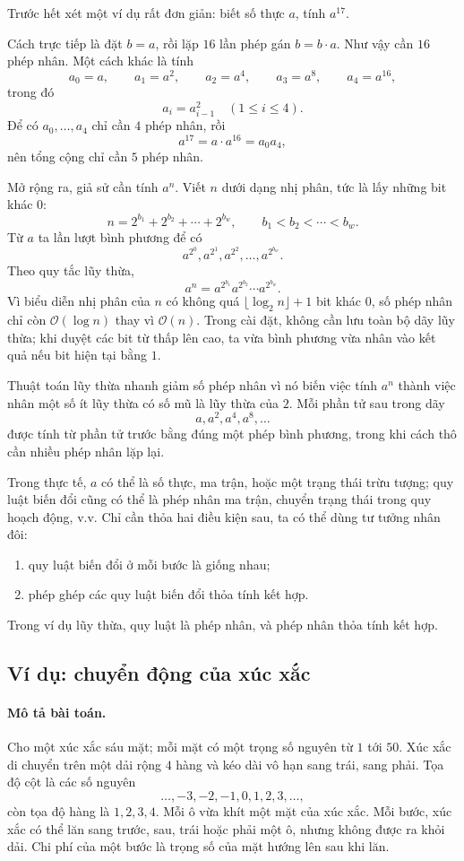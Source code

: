 \documentclass[11pt]{article}
\newcommand{\Oh}{\mathcal{O}}
\begin{document}
Trước hết xét một ví dụ rất đơn giản: biết số thực $a$, tính $a^{17}$.

Cách trực tiếp là đặt $b=a$, rồi lặp $16$ lần phép gán $b=b\cdot a$. Như vậy
cần $16$ phép nhân. Một cách khác là tính
\[
  a_0=a,\qquad a_1=a^2,\qquad a_2=a^4,\qquad
  a_3=a^8,\qquad a_4=a^{16},
\]
trong đó
\[
  a_i=a_{i-1}^2\quad (1\le i\le 4).
\]
Để có $a_0,\ldots,a_4$ chỉ cần $4$ phép nhân, rồi
\[
  a^{17}=a\cdot a^{16}=a_0a_4,
\]
nên tổng cộng chỉ cần $5$ phép nhân.

Mở rộng ra, giả sử cần tính $a^n$. Viết $n$ dưới dạng nhị phân, tức là lấy
những bit khác $0$:
\[
  n=2^{b_1}+2^{b_2}+\cdots+2^{b_w},\qquad
  b_1<b_2<\cdots<b_w.
\]
Từ $a$ ta lần lượt bình phương để có
\[
  a^{2^0},a^{2^1},a^{2^2},\ldots,a^{2^{b_w}}.
\]
Theo quy tắc lũy thừa,
\[
  a^n=a^{2^{b_1}}a^{2^{b_2}}\cdots a^{2^{b_w}}.
\]
Vì biểu diễn nhị phân của $n$ có không quá $\lfloor \log_2 n\rfloor+1$ bit
khác $0$, số phép nhân chỉ còn $\Oh(\log n)$ thay vì $\Oh(n)$. Trong cài đặt,
không cần lưu toàn bộ dãy lũy thừa; khi duyệt các bit từ thấp lên cao, ta vừa
bình phương vừa nhân vào kết quả nếu bit hiện tại bằng $1$.

Thuật toán lũy thừa nhanh giảm số phép nhân vì nó biến việc tính $a^n$ thành
việc nhân một số ít lũy thừa có số mũ là lũy thừa của $2$. Mỗi phần tử sau
trong dãy
\[
  a,a^2,a^4,a^8,\ldots
\]
được tính từ phần tử trước bằng đúng một phép bình phương, trong khi cách thô
cần nhiều phép nhân lặp lại.

Trong thực tế, $a$ có thể là số thực, ma trận, hoặc một trạng thái trừu
tượng; quy luật biến đổi cũng có thể là phép nhân ma trận, chuyển trạng thái
trong quy hoạch động, v.v. Chỉ cần thỏa hai điều kiện sau, ta có thể dùng tư
tưởng nhân đôi:
\begin{enumerate}
  \item quy luật biến đổi ở mỗi bước là giống nhau;
  \item phép ghép các quy luật biến đổi thỏa tính kết hợp.
\end{enumerate}
Trong ví dụ lũy thừa, quy luật là phép nhân, và phép nhân thỏa tính kết hợp.

\subsection{Ví dụ: chuyển động của xúc xắc}

\paragraph{Mô tả bài toán.}
Cho một xúc xắc sáu mặt; mỗi mặt có một trọng số nguyên từ $1$ tới $50$. Xúc
xắc di chuyển trên một dải rộng $4$ hàng và kéo dài vô hạn sang trái, sang
phải. Tọa độ cột là các số nguyên
\[
  \ldots,-3,-2,-1,0,1,2,3,\ldots,
\]
còn tọa độ hàng là $1,2,3,4$. Mỗi ô vừa khít một mặt của xúc xắc. Mỗi bước,
xúc xắc có thể lăn sang trước, sau, trái hoặc phải một ô, nhưng không được ra
khỏi dải. Chi phí của một bước là trọng số của mặt hướng lên sau khi lăn.
\end{document}
